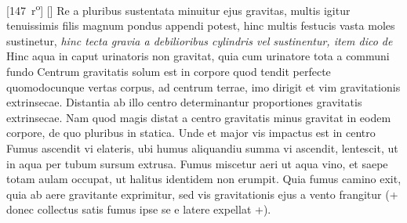 [147~r\textsuperscript{o}]
\pend%
\pstart%
% 
%
%
% 
[]  Re a pluribus sustentata minuitur ejus gravitas, multis igitur tenuissimis filis\protect{} magnum pondus appendi potest, hinc multis festucis vasta moles sustinetur, \textit{hinc tecta gravia a debilioribus cylindris vel}  \textit{sustinentur, item dico de } Hinc aqua in caput urinatoris\protect{} non gravitat, quia cum urinatore tota a communi fundo 
\pend 
\pstart {} Centrum gravitatis\protect{} solum est in corpore quod tendit perfecte quomodocunque vertas corpus, ad centrum terrae, imo dirigit et vim gravitationis extrinsecae. Distantia ab illo centro determinantur proportiones gravitatis\protect{} extrinsecae. Nam quod magis distat a centro gravitatis minus gravitat in eodem corpore, de quo pluribus in statica. Unde et major vis impactus est in centro 
\pend 
\pstart {} Fumus\protect{} ascendit vi elateris, ubi humus aliquandiu summa vi ascendit, lentescit, ut in aqua per tubum sursum extrusa. Fumus miscetur aeri
ut aqua vino, et saepe totam aulam occupat, ut halitus
 identidem non erumpit. Quia fumus camino exit, quia ab aere gravitante exprimitur, sed vis gravitationis ejus a vento frangitur (+ donec collectus satis fumus ipse se e latere expellat +).
